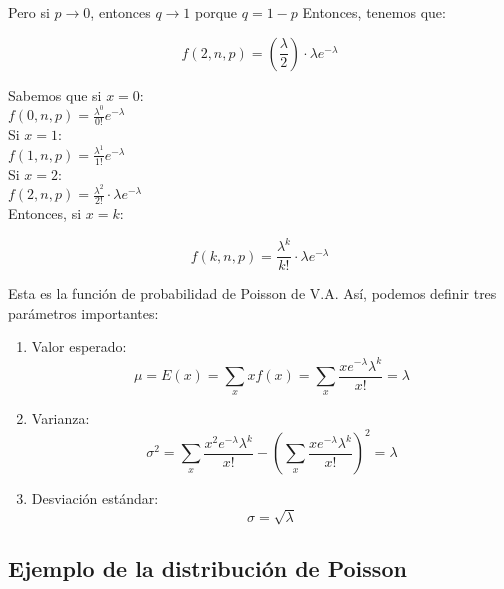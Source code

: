 Pero si $p \to 0$, entonces $q \to 1$ porque $q=1-p$
Entonces, tenemos que:

\begin{equation}
  f(2,n,p)  = (\frac{\lambda}{2}) \cdot \lambda e^{-\lambda}
\end{equation}

Sabemos que si $x=0$: \\
$f(0,n,p) = \frac{\lambda^0}{0!} e^{-\lambda}$\\

Si $x=1$: \\
$f(1,n,p) = \frac{\lambda^1}{1!} e^{-\lambda}$\\

Si $x=2$: \\
$f(2,n,p)  = \frac{\lambda^2}{2!} \cdot \lambda e^{-\lambda}$\\


Entonces, si $x=k$:

\begin{equation}
  f(k,n,p)  = \frac{\lambda^k}{k!} \cdot \lambda e^{-\lambda}
\end{equation}

Esta es la función de probabilidad de Poisson de V.A. Así, podemos definir tres
parámetros importantes:

\begin{enumerate}
  \item Valor esperado:
  \begin{equation}
    \mu = E(x) = \sum_{x} xf(x) = \sum_{x} \frac{x e^{-\lambda}\lambda^k}{x!} = \lambda
  \end{equation}

\item Varianza:
\begin{equation}
  \sigma^2 = \sum_{x} \frac{x^2 e^{-\lambda}\lambda^k}{x!} - (\sum_{x} \frac{x e^{-\lambda}\lambda^k}{x!})^2 = \lambda
\end{equation}

\item Desviación estándar:
\begin{equation}
  \sigma = \sqrt{\lambda}
\end{equation}

\end{enumerate}

\subsection{Ejemplo de la distribución de Poisson}

